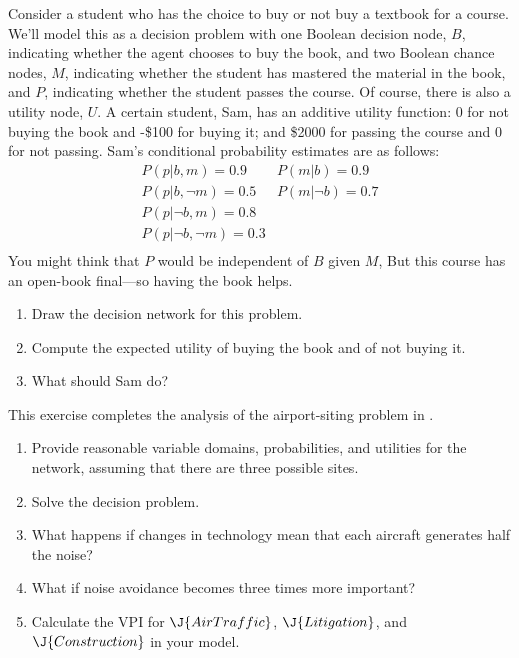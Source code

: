 \begin{exercise}
Consider a student who has the choice to buy or not buy a textbook for
a course.  We'll model this as a decision problem with one Boolean
decision node, \(B\), indicating whether the agent chooses to buy the
book, and two Boolean chance nodes, \(M\), indicating whether the
student has mastered the material in the book, and \(P\), indicating
whether the student passes the course.  Of course, there is also a
utility node, \(U\).  A certain student, Sam, has an additive utility
function: 0 for not buying the book and -\$100 for buying it; and \$2000
for passing the course and 0 for not passing.  Sam's conditional probability
estimates are as follows:
\[\begin{array}{ll}
P(p|b,m) = 0.9              & P(m|b) = 0.9       \\
P(p|b, \lnot m) = 0.5       & P(m|\lnot b) = 0.7 \\
P(p|\lnot b, m) = 0.8       & \\
P(p|\lnot b, \lnot m) = 0.3 & \\
\end{array}\]
You might think that \(P\) would be independent of \(B\) given \(M\), But this course has an open-book final---so having the book helps.
\begin{enumerate}
\item Draw the decision network for this problem.
\item Compute the expected utility of buying the book and of not buying it.
\item What should Sam do?
\end{enumerate}
\end{exercise} 



\begin{exercise}%
\prgex
This exercise completes the analysis of the airport-siting problem in .
\begin{enumerate}
\item Provide reasonable variable domains, probabilities, and
utilities for the network, assuming that there are three possible
sites.
\item Solve the decision problem.
\item What happens if changes in technology mean that each aircraft generates half the
noise? 
\item What if noise avoidance becomes three times more important?
\item Calculate the VPI for \(\J{AirTraffic}\), \(\J{Litigation}\), and \(\J{Construction}\)
in your model.
\end{enumerate}
\end{exercise} 

